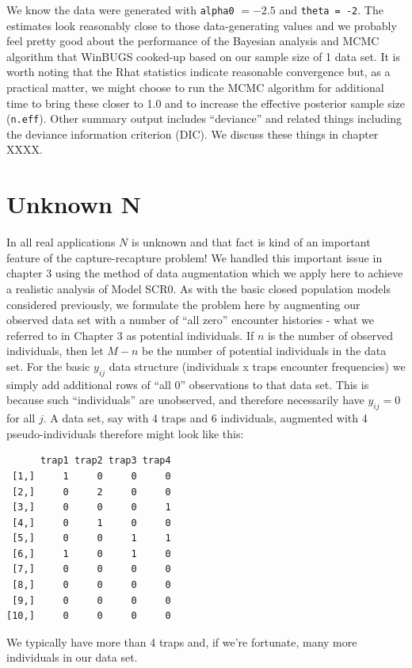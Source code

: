 We know the data were generated with \mbox{\tt alpha0} $= -2.5$ and
\mbox{\tt theta = -2}. The estimates look reasonably close to those
data-generating values and we probably feel pretty good about the
performance of the Bayesian analysis and MCMC algorithm that WinBUGS
cooked-up based on our sample size of 1 data set.  It is worth noting
that the Rhat statistics indicate reasonable convergence but, as a
practical matter, we might choose to run the MCMC algorithm for
additional time to bring these closer to 1.0 and to increase the
effective posterior sample size (\mbox{\tt n.eff}). Other summary output includes
``deviance'' and related things including the deviance information
criterion (DIC). We discuss these things in chapter XXXX.



\section{Unknown N}
\label{scr0.sec.unknownN}

In all real applications $N$ is unknown and that fact is kind of an
important feature of the capture-recapture problem!  We handled this
important issue in chapter 3 using the method of data augmentation
which we apply here to achieve a realistic analysis of Model SCR0. As
with the basic closed population models considered previously, we
formulate the problem here by augmenting our observed data set with a
number of ``all zero'' encounter histories - what we referred to in
Chapter 3 as potential individuals. If $n$ is the number of observed
individuals, then let $M-n$ be the number of potential individuals in
the data set. For the basic $y_{ij}$ data structure (individuals x
traps encounter frequencies) we simply add additional rows of ``all
0'' observations to that data set. This is because such
``individuals'' are unobserved, and therefore necessarily have
$y_{ij}=0$ for all $j$.  A data set, say with 4 traps and 6 individuals,
augmented with 4 pseudo-individuals therefore might look like this:
\begin{verbatim}
      trap1 trap2 trap3 trap4 
 [1,]     1     0     0     0
 [2,]     0     2     0     0
 [3,]     0     0     0     1
 [4,]     0     1     0     0
 [5,]     0     0     1     1
 [6,]     1     0     1     0
 [7,]     0     0     0     0
 [8,]     0     0     0     0
 [9,]     0     0     0     0
[10,]     0     0     0     0
\end{verbatim}
We typically have more than 4 traps and, if we're fortunate, many more
individuals in our data set.

